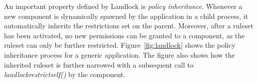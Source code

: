 An important property defined by Landlock is {\em policy inheritance}.
Whenever a new component is dynamically spawned by the application in
a child process, it automatically inherits the restrictions set on the
parent. Moreover, after a ruleset has been activated, no new
permissions can be granted to a component, as the ruleset can only be
further restricted. Figure~\ref{fig:landlock} shows the policy
inheritance process for a generic application. The figure also shows
how the inherited ruleset is further narrowed with a subsequent call
to {\em landlock\textunderscore restrict\textunderscore self()} by the
component.




